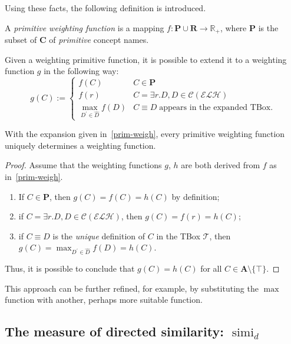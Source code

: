 \documentclass{llncs}
\DeclareMathOperator{\simi}{simi}
\begin{document}
  Using these facts, the following definition is introduced.
  \begin{definition}
    A \emph{primitive weighting function} is a mapping \(f \colon \mathbf{P} \cup \mathbf{R} \to \mathbb{R}_+\), where \(\mathbf{P}\) is the subset of \(\mathbf{C}\) of \emph{primitive} concept names.
  \end{definition}
  Given a weighting primitive function, it is possible to extend it to a weighting function \(g\) in the following way:
  \begin{equation}\label{prim-weigh}
    g(C) :=
    \begin{cases}
      f(C) & C \in \mathbf{P} \\
      f(r) & C = \exists{}r.D, D \in \mathcal{C}(\mathcal{ELH}) \\
      \max_{D^\prime \in \widehat{D}}f(D) & C \equiv D \; \text{appears in the expanded TBox.}
    \end{cases}
  \end{equation}
  \begin{proposition}
    With the expansion given in~\eqref{prim-weigh}, every primitive weighting function uniquely determines a weighting function.
  \end{proposition}
  \begin{proof}
    Assume that the weighting functions \(g\), \(h\) are both derived from \(f\) as in~\eqref{prim-weigh}.
    \begin{enumerate}
      \item If \(C \in \mathbf{P}\), then
      \(g(C) = f(C) = h(C)\) by definition;
      \item if \(C =  \exists{}r.D, D \in \mathcal{C}(\mathcal{ELH})\), then \(g(C) = f(r) = h(C)\);
      \item if \(C \equiv D\) is the \emph{unique} definition of \(C\) in the TBox \(\mathcal{T}\), then
      \(g(C) = \max_{D^\prime \in \widehat{D}}f(D) = h(C)\).
    \end{enumerate}
    Thus, it is possible to conclude that \(g(C) = h(C)\) for all \(C \in \mathbf{A} \setminus \lbrace \top \rbrace\).
  \end{proof}
  This approach can be further refined, for example, by substituting the \(\max\) function with another, perhaps more suitable function.

\subsection{The measure of directed similarity: \(\simi_d\)}
\end{document}
